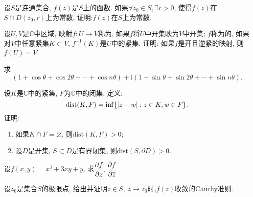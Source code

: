 \begin{yyEx}
    设$S$是连通集合, $f(z)$是$S$上的函数. 如果$\forall z_0\in S, \exists r>0$, 使得$f(z)$在$S\cap D(z_0,r)$上为常数, 证明:$f(z)$在$S$上为常数.
\end{yyEx}

\begin{yyEx}
    设$U,V$是$\mathbb{C}$中区域, 映射$f:U\to V$称为, 如果$f$将$U$中开集映为$V$中开集; $f$称为的, 如果对$V$中任意紧集$K\subset V$, $f^{-1}(K)$是$U$中的紧集. 证明: 如果$f$是开且逆紧的映射, 则$f(U) = V$.
\end{yyEx}

\begin{yyEx}
    求\begin{equation*}
        (1+\cos\theta+\cos 2\theta+\cdots+\cos n\theta) + \mathrm{i}  (1+\sin\theta+\sin 2\theta+\cdots+\sin n\theta).  
    \end{equation*}
\end{yyEx}

\begin{yyEx}
    设$K$是$\mathbb{C}$中的紧集, $F$为$\mathbb{C}$中的闭集. 定义:
    \begin{equation*}
        \mathrm{dist}(K,F) = \mathrm{inf}\{ \lvert z-w\rvert:z\in K,w\in F \}.
    \end{equation*}
    证明:\begin{enumerate}
        \item 如果$K\cap F=\varnothing$, 则$\mathrm{dist}(K,F)>0$;
        \item 设$D$是开集, $S\subset D$是有界闭集, 则$\mathrm{dist}(S,\partial D)>0$.
    \end{enumerate}
\end{yyEx}

\begin{yyEx}
    设$f(x,y) = x^3+3xy+y$, 求$\begin{lgathered}
    \frac{\partial f}{\partial z},\frac{\partial f}{\partial \overline{z}}
    \end{lgathered}$
\end{yyEx}

\begin{yyEx}
    设$z_0$是集合$S$的极限点, 给出并证明$z\in S,~z\to z_0$时,$f(z)$收敛的Cauchy准则.
\end{yyEx}

